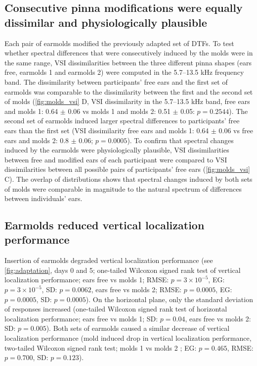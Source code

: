 \subsection{Consecutive pinna modifications were equally dissimilar and physiologically plausible}

Each pair of earmolds modified the previously adapted set of DTFs. To test whether spectral differences that were consecutively induced by the molds were in the same range, VSI dissimilarities between the three different pinna shapes (ears free, earmolds 1 and earmolds 2) were computed in the 5.7–13.5 kHz frequency band. The dissimilarity between participants' free ears and the first set of earmolds was comparable to the dissimilarity between the first and the second set of molds (\cref{fig:molds_vsi} D, VSI dissimilarity in the 5.7–13.5 kHz band, free ears and molds 1:  0.64 $\pm$ 0.06 vs molds 1 and molds 2:  0.51 $\pm$ 0.05: $p = 0.2544$). The second set of earmolds induced larger spectral differences to participants' free ears than the first set (VSI dissimilarity free ears and molds 1:  0.64 $\pm$ 0.06 vs free ears and molds 2: 0.8 $\pm$ 0.06; $p = 0.0005$). To confirm that spectral changes induced by the earmolds were physiologically plausible, VSI dissimilarities between free and modified ears of each participant were compared to VSI dissimilarities between all possible pairs of participants’ free ears (\cref{fig:molds_vsi} C). The overlap of distributions shows that spectral changes induced by both sets of molds were comparable in magnitude to the natural spectrum of differences between individuals’ ears.

\subsection{Earmolds reduced vertical localization performance}

Insertion of earmolds degraded vertical localization performance (see \cref{fig:adaptation}, days 0 and 5; one-tailed Wilcoxon signed rank test of vertical localization performance; ears free vs molds 1; RMSE: $p = 3  \times 10^{-5}$, EG: $p = 3 \times 10^{-5}$, SD: $p = 0.0062$, ears free vs molds 2; RMSE: $p = 0.0005$, EG: $p = 0.0005$, SD: $p = 0.0005$). On the horizontal plane, only the standard deviation of responses increased (one-tailed Wilcoxon signed rank test of horizontal localization performance; ears free vs molds 1; SD: $p = 0.04$, ears free vs molds 2: SD: $p = 0.005$). Both sets of earmolds caused a similar decrease of vertical localization performance (mold induced drop in vertical localization performance, two-tailed Wilcoxon signed rank test; molds 1 vs molds 2 ; EG: $p = 0.465$, RMSE: $p = 0.700$, SD: $p = 0.123$).

